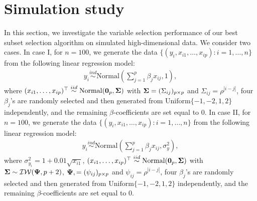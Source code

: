 \section{Simulation study}\label{sec:5}
In this section, we investigate the variable selection performance of our best subset selection algorithm on simulated high-dimensional data. We consider two cases. In case I, for $n=100$, we generate the data $\{(y_i,x_{i1},\ldots,x_{ip}):i=1,\ldots,n\}$ from the following linear regression model:
\begin{eqnarray*}
	y_i\overset{ind}{\sim}\text{Normal}\left(\sum_{j=1}^p \beta_j x_{ij},1\right),
\end{eqnarray*}
where $(x_{i1},\ldots,x_{ip})^{ \top} \overset{iid}{\sim}\text{Normal}({\boldsymbol 0}_p,{\boldsymbol \Sigma})$ with ${\boldsymbol \Sigma}=(\Sigma_{ij})_{p\times p}$ and $\Sigma_{ij}=\rho^{|i-j|}$, four $\beta_j$'s are randomly selected and then generated from $\text{Uniform}\{-1,-2,1,2\}$ independently, and the remaining $\beta$-coefficients are set equal to $0$. In case II, for $n=100$, we generate the data $\{(y_i,x_{i1},\ldots,x_{ip}):i=1,\ldots,n\}$ from the following linear regression model:
\begin{eqnarray*}
	y_i\overset{ind}{\sim}\text{Normal}\left(\sum_{j=1}^p \beta_j x_{ij},\sigma^2_{y}\right),
\end{eqnarray*}
where $\sigma^2_{y_i} = 1+0.01\sqrt{x_{i1}}$, $(x_{i1},\ldots,x_{ip})^{ \top} \overset{iid}{\sim}\text{Normal}({\boldsymbol 0}_p,{\boldsymbol \Sigma})$ with ${\boldsymbol \Sigma}\sim \mathcal{IW}({\boldsymbol \Psi}, p+2)$, ${\boldsymbol \Psi},=(\psi_{ij})_{p\times p}$ and $\psi_{ij}=\rho^{|i-j|}$, four $\beta_j$'s are randomly selected and then generated from $\text{Uniform}\{-1,-2,1,2\}$ independently, and the remaining $\beta$-coefficients are set equal to $0$. 

